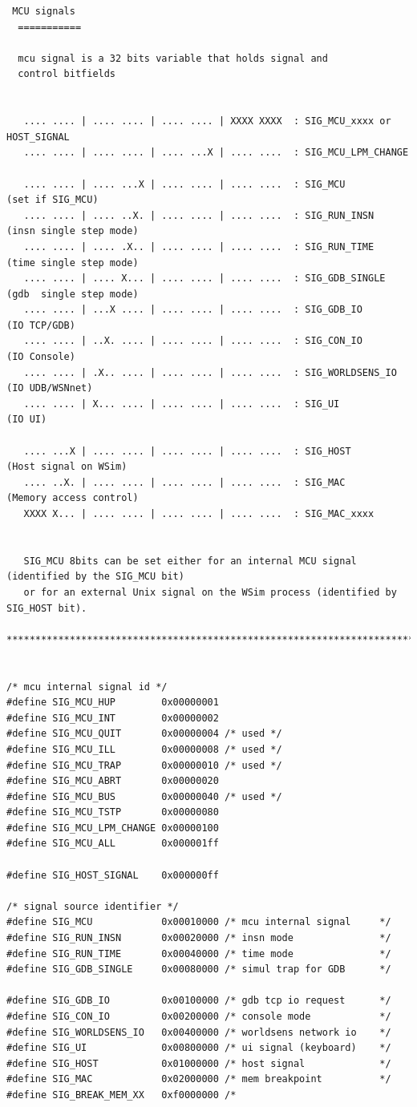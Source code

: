 \documentclass[a4paper,10pt]{report}
\begin{document}
\begin{verbatim}
 MCU signals
  ===========

  mcu signal is a 32 bits variable that holds signal and 
  control bitfields

 
   .... .... | .... .... | .... .... | XXXX XXXX  : SIG_MCU_xxxx or HOST_SIGNAL
   .... .... | .... .... | .... ...X | .... ....  : SIG_MCU_LPM_CHANGE
  
   .... .... | .... ...X | .... .... | .... ....  : SIG_MCU          (set if SIG_MCU)
   .... .... | .... ..X. | .... .... | .... ....  : SIG_RUN_INSN     (insn single step mode)
   .... .... | .... .X.. | .... .... | .... ....  : SIG_RUN_TIME     (time single step mode)
   .... .... | .... X... | .... .... | .... ....  : SIG_GDB_SINGLE   (gdb  single step mode)
   .... .... | ...X .... | .... .... | .... ....  : SIG_GDB_IO       (IO TCP/GDB)
   .... .... | ..X. .... | .... .... | .... ....  : SIG_CON_IO       (IO Console)
   .... .... | .X.. .... | .... .... | .... ....  : SIG_WORLDSENS_IO (IO UDB/WSNnet)
   .... .... | X... .... | .... .... | .... ....  : SIG_UI           (IO UI)
  
   .... ...X | .... .... | .... .... | .... ....  : SIG_HOST         (Host signal on WSim)
   .... ..X. | .... .... | .... .... | .... ....  : SIG_MAC          (Memory access control)
   XXXX X... | .... .... | .... .... | .... ....  : SIG_MAC_xxxx


   SIG_MCU 8bits can be set either for an internal MCU signal (identified by the SIG_MCU bit)
   or for an external Unix signal on the WSim process (identified by SIG_HOST bit).

**********************************************************************************************/


/* mcu internal signal id */
#define SIG_MCU_HUP        0x00000001
#define SIG_MCU_INT        0x00000002
#define SIG_MCU_QUIT       0x00000004 /* used */
#define SIG_MCU_ILL        0x00000008 /* used */
#define SIG_MCU_TRAP       0x00000010 /* used */
#define SIG_MCU_ABRT       0x00000020
#define SIG_MCU_BUS        0x00000040 /* used */
#define SIG_MCU_TSTP       0x00000080
#define SIG_MCU_LPM_CHANGE 0x00000100
#define SIG_MCU_ALL        0x000001ff

#define SIG_HOST_SIGNAL    0x000000ff

/* signal source identifier */
#define SIG_MCU            0x00010000 /* mcu internal signal     */
#define SIG_RUN_INSN       0x00020000 /* insn mode               */
#define SIG_RUN_TIME       0x00040000 /* time mode               */
#define SIG_GDB_SINGLE     0x00080000 /* simul trap for GDB      */

#define SIG_GDB_IO         0x00100000 /* gdb tcp io request      */
#define SIG_CON_IO         0x00200000 /* console mode            */
#define SIG_WORLDSENS_IO   0x00400000 /* worldsens network io    */
#define SIG_UI             0x00800000 /* ui signal (keyboard)    */
#define SIG_HOST           0x01000000 /* host signal             */
#define SIG_MAC            0x02000000 /* mem breakpoint          */
#define SIG_BREAK_MEM_XX   0xf0000000 /*                 
\end{verbatim}
\end{document}
